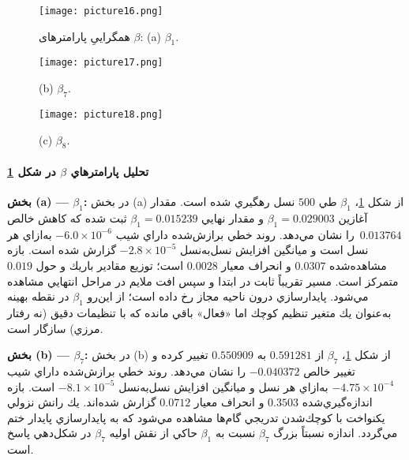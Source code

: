 \begin{figure}[h]
  \centering
  \texttt{[image: picture16.png]}%
  \caption{همگراییِ پارامترهای \(\beta\): (a) \(\beta_1\).}
  \label{fig:beta_convergence}
\end{figure}

\begin{figure}[h]\ContinuedFloat
  \centering
  \texttt{[image: picture17.png]}%
  \caption{(b) \(\beta_7\).}
\end{figure}

\begin{figure}[h]\ContinuedFloat
  \centering
  \texttt{[image: picture18.png]}%
  \caption{(c) \(\beta_8\).}
\end{figure}

\paragraph{تحليل پارامترهاي \(\beta\) در شكل \ref{fig:beta_convergence}}

\textbf{بخش (a) — \(\beta_1\):}
در بخش (a) از شكل \ref{fig:beta_convergence}، \(\beta_1\) طي \(500\) نسل رهگيري شده است. مقدار آغازين \(\beta_1=0.029003\) و مقدار نهايي \(\beta_1=0.015239\) ثبت شده كه كاهش خالص \(\,0.013764\) را نشان مي‌دهد. روند خطي برازش‌شده داراي شيب \(-6.0\times 10^{-6}\) به‌ازاي هر نسل است و ميانگين افزايش نسل‌به‌نسل \(-2.8\times 10^{-5}\) گزارش شده است. بازه مشاهده‌شده \(0.0307\) و انحراف معيار \(0.0028\) است؛ توزيع مقادير باريك و حول \(0.019\) متمركز است. مسير تقريباً ثابت در ابتدا و سپس افت ملايم در مراحل انتهايي مشاهده مي‌شود. پايدارسازي درون ناحيه مجاز رخ داده است؛ از اين‌رو \(\beta_1\) در نقطه بهينه به‌عنوان يك متغير تنظيم كوچك اما «فعال» باقي مانده كه با تنظيمات دقيق (نه رفتار مرزي) سازگار است.

\medskip
\textbf{بخش (b) — \(\beta_7\):}
در بخش (b) از شكل \ref{fig:beta_convergence}، \(\beta_7\) از \(0.591281\) به \(0.550909\) تغيير كرده و تغيير خالص \(-0.040372\) را نشان مي‌دهد. روند خطي برازش‌شده داراي شيب \(-4.75\times 10^{-4}\) به‌ازاي هر نسل و ميانگين افزايش نسل‌به‌نسل \(-8.1\times 10^{-5}\) است. بازه اندازه‌گيري‌شده \(0.3503\) و انحراف معيار \(0.0712\) گزارش شده‌اند. يك رانش نزولي يکنواخت با كوچك‌شدن تدريجي گام‌ها مشاهده مي‌شود كه به پايدارسازي پايدار ختم مي‌گردد. اندازه نسبتاً بزرگ \(\beta_7\) نسبت به \(\beta_1\) حاكي از نقش اوليه \(\beta_7\) در شكل‌دهي پاسخ  است.


